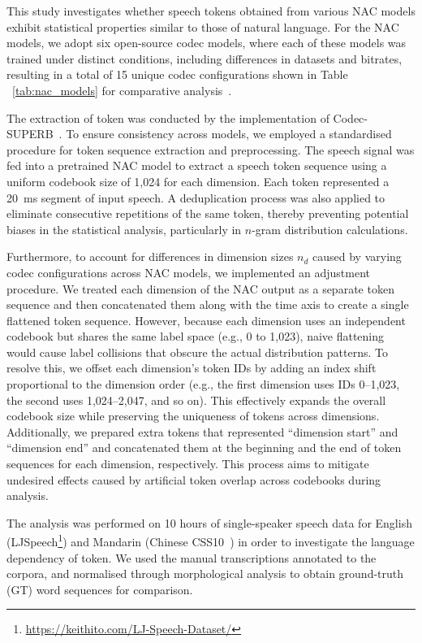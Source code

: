 \documentclass[conference]{IEEEtran}
\begin{document}
This study investigates whether speech tokens obtained from various NAC models exhibit statistical properties similar to those of natural language. For the NAC models, we adopt six open-source codec models, where each of these models was trained under distinct conditions, including differences in datasets and bitrates, resulting in a total of 15 unique codec configurations shown in Table ~\ref{tab:nac_models} for comparative analysis~\cite{wu2024audiolanguagemodeling}. 

The extraction of token was conducted by the implementation of Codec-SUPERB~\cite{codecsuperb}.
To ensure consistency across models, we employed a standardised procedure for token sequence extraction and preprocessing. The speech signal was fed into a pretrained NAC model to extract a speech token sequence using a uniform codebook size of 1,024 for each dimension. Each token represented a 20~ms segment of input speech.
A deduplication process was also applied to eliminate consecutive repetitions of the same token, thereby preventing potential biases in the statistical analysis, particularly in $n$-gram distribution calculations.

Furthermore, to account for differences in dimension sizes $n_d$ caused by varying codec configurations across NAC models, we implemented an adjustment procedure. 
We treated each dimension of the NAC output as a separate token sequence and then concatenated them along with the time axis to create a single flattened token sequence. 
However, because each dimension uses an independent codebook but shares the same label space (e.g., 0 to 1,023), naive flattening would cause label collisions that obscure the actual distribution patterns. 
To resolve this, we offset each dimension’s token IDs by adding an index shift proportional to the dimension order (e.g., the first dimension uses IDs 0–1,023, the second uses 1,024–2,047, and so on). This effectively expands the overall codebook size while preserving the uniqueness of tokens across dimensions. Additionally, we prepared extra tokens that represented ``dimension start'' and ``dimension end'' and concatenated them at the beginning and the end of token sequences for each dimension, respectively. This process aims to mitigate undesired effects caused by artificial token overlap across codebooks during analysis.

The analysis was performed on 10 hours of single-speaker speech data for English (LJSpeech\footnote{\url{https://keithito.com/LJ-Speech-Dataset/}}) and Mandarin (Chinese CSS10~\cite{Park2019CSS10AC})
in order to investigate the language dependency of token. We used the manual transcriptions annotated to the corpora, and normalised through morphological analysis to obtain ground-truth (GT) word sequences for comparison.
\vspace{-1mm}
\end{document}
